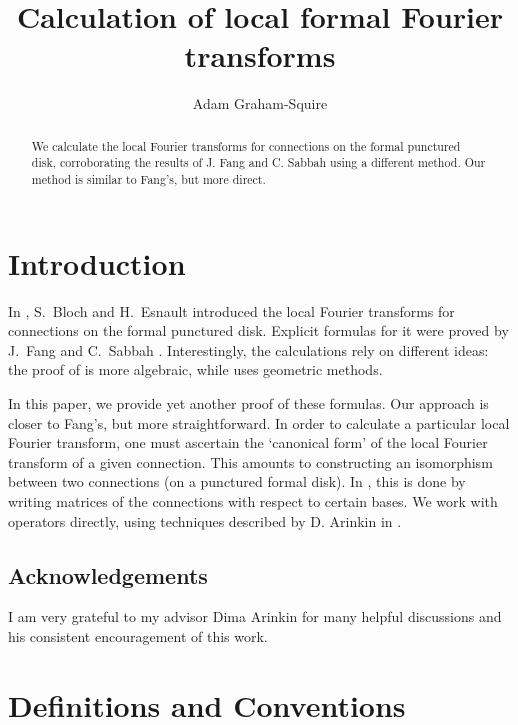 \documentclass[11pt]{amsart}
\theoremstyle{theorem}
\theoremstyle{lemma}
\theoremstyle{corollary}
\theoremstyle{proposition}
\theoremstyle{definition}
\theoremstyle{remark}
\begin{document}
\normalsize

\title{Calculation of local formal Fourier transforms}
\author{Adam Graham-Squire}
\date{}





 \begin{abstract} We calculate the local Fourier transforms for connections on the formal punctured disk, corroborating the results of J. Fang \cite{fang} and C. Sabbah \cite{sabbah} using a different method. Our method is similar to Fang's, but more direct.
 \end{abstract}

\maketitle

\section{Introduction}

In \cite{bloch}, S.~Bloch and H.~Esnault introduced the local Fourier transforms for connections on the formal punctured disk.
Explicit formulas for it were proved by J.~Fang \cite{fang} and C.~Sabbah \cite{sabbah}. Interestingly, the calculations rely
on different ideas: the proof of \cite{fang} is more algebraic, while \cite{sabbah} uses geometric methods.

In this paper, we provide yet another proof of these formulas. Our approach is closer to Fang's, but more straightforward. In order to
calculate a particular local Fourier transform, one must ascertain the `canonical form' of the local Fourier transform of a given connection.
This amounts to constructing an isomorphism between two connections (on a punctured formal disk). In \cite{fang}, this is done
by writing matrices of the connections with respect to certain bases. We work with operators directly, using techniques
described by D. Arinkin in \cite[Section 7]{dima}.

\subsection*{Acknowledgements} I am very grateful to my advisor Dima Arinkin for many helpful discussions and his consistent encouragement of this work.

\section{Definitions and Conventions}
\end{document}
